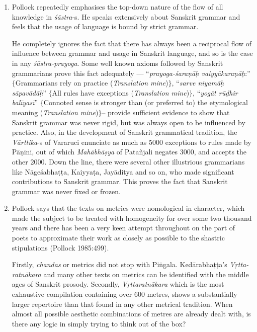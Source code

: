 \begin{enumerate}
\item Pollock repeatedly emphasises the top-down nature of the flow of all knowledge in {\sl śāstra}-s. He speaks extensively about Sanskrit grammar and feels that the usage of language is bound by strict grammar. 

He completely ignores the fact that there has always been a reciprocal flow of influence between grammar and usage in Sanskrit language, and so is the case in any {\sl śāstra-prayoga}. Some well known axioms followed by Sanskrit grammarians prove this fact adequately --- ``{\sl prayoga-śaraṇāḥ vaiyyākaraṇāḥ}:'' $\{$Grammarians rely on practice ({\sl Translation mine})$\}$, ``{\sl sarve niyamāḥ sāpavādāḥ}'' $\{$All rules have exceptions ({\sl Translation mine})$\}$, ``{\sl yogāt rūḍhir balīyasī}'' $\{$Connoted sense is stronger than (or preferred to) the etymological meaning ({\sl Translation mine})$\}$-- provide sufficient evidence to show that Sanskrit grammar was never rigid, but was always open to be influenced by practice. Also, in the development of Sanskrit grammatical tradition, the  {\sl Vārttika}-s of Vararuci enunciate as much as 5000 exceptions to rules made by Pāṇini, out of which {\sl Mahābhāṣya} of Patañjali negates 3000, and accepts the other 2000. Down the line, there were several other illustrious grammarians like Nāgeśabhaṭṭa, Kaiyyaṭa, Jayāditya and so on, who made significant contributions to Sanskrit grammar. This proves the fact that Sanskrit grammar was never fixed or frozen.

\item Pollock says that the texts on metrics were nomological in character, which made the subject to be treated with homogeneity for over some two thousand years and there has been a very keen attempt throughout on the part of poets to approximate their work as closely as possible to the shastric stipulations (Pollock 1985:499). 

Firstly, {\sl chandas} or metrics did not stop with Piṅgala. Kedārabhaṭṭa's {\sl Vṛtta-ratnākara} and many other texts on metrics can be identified with the middle ages of Sanskrit prosody. Secondly, {\sl Vṛttaratnākara} which is the most exhaustive compilation containing over 600 metres,  shows a substantially larger repertoire than that found in any other metrical tradition. When almost all possible aesthetic combinations of metres are already dealt with, is there any logic in simply trying to think out of the box?  


\end{enumerate}
